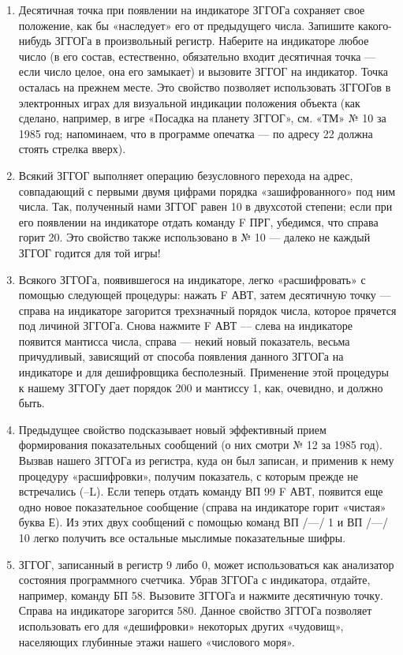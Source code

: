 \documentclass[11pt,a4paper,oneside]{article}
\begin{document}
\begin{enumerate}
\item Десятичная точка при появлении на индикаторе ЗГГОГа сохраняет свое положение, как бы «наследует» его от предыдущего числа. Запишите какого-нибудь ЗГГОГа в произвольный регистр. Наберите на индикаторе любое число (в его состав, естественно, обязательно входит десятичная точка — если число целое, она его замыкает) и вызовите ЗГГОГ на индикатор. Точка осталась на прежнем месте. Это свойство позволяет использовать 3ГГОГов в электронных играх для визуальной индикации положения объекта (как сделано, например, в игре «Посадка на планету ЗГГОГ», см. «ТМ» № 10 за 1985 год; напоминаем, что в программе опечатка — по адресу 22 должна стоять стрелка вверх).
\item Всякий ЗГГОГ выполняет операцию безусловного перехода на адрес, совпадающий с первыми двумя цифрами порядка «зашифрованного» под ним числа. Так, полученный нами ЗГГОГ равен 10 в двухсотой степени; если при его появлении на индикаторе отдать команду F ПРГ, убедимся, что справа горит 20. Это свойство также использовано в № 10 — далеко не каждый ЗГГОГ годится для той игры!
\item Всякого ЗГГОГа, появившегося на индикаторе, легко «расшифровать» с помощью следующей процедуры: нажать F АВТ, затем десятичную точку — справа на индикаторе загорится трехзначный порядок числа, которое прячется под личиной ЗГГОГа. Снова нажмите F АВТ — слева на индикаторе появится мантисса числа, справа — некий новый показатель, весьма причудливый, зависящий от способа появления данного ЗГГОГа на индикаторе и для дешифровщика бесполезный. Применение этой процедуры к нашему ЗГГОГу дает порядок 200 и мантиссу 1, как, очевидно, и должно быть.
\item Предыдущее свойство подсказывает новый эффективный прием формирования показательных сообщений (о них смотри № 12 за 1985 год). Вызвав нашего ЗГГОГа из регистра, куда он был записан, и применив к нему процедуру «расшифровки», получим показатель, с которым прежде не встречались (--L). Если теперь отдать команду ВП 99 F АВТ, появится еще одно новое показательное сообщение (справа на индикаторе горит «чистая» буква Е). Из этих двух сообщений с помощью команд ВП /—/ 1 и ВП /—/ 10 легко получить все остальные мыслимые показательные шифры.
\item ЗГГОГ, записанный в регистр 9 либо 0, может использоваться как анализатор состояния программного счетчика. Убрав ЗГГОГа с индикатора, отдайте, например, команду БП 58. Вызовите ЗГГОГа и нажмите десятичную точку. Справа на индикаторе загорится 580. Данное свойство ЗГГОГа позволяет использовать его для «дешифровки» некоторых других «чудовищ», населяющих глубинные этажи нашего «числового моря».
\end{enumerate}
\end{document}
